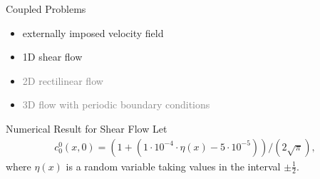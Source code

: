 \begin{frame}{Coupled Problems}
	\begin{itemize}
		\item externally imposed velocity field \checkmark
		\item 1D shear flow \checkmark
		\item \textcolor{gray}{2D rectilinear flow \checkmark}
		\item \textcolor{gray}{3D flow with periodic boundary conditions}
	\end{itemize}
\end{frame}

\begin{frame}{Numerical Result for Shear Flow}
		\scriptsize
		Let 
		\begin{align*}
			c^0_0 (x,0) = (1+(1\cdot10^{-4} \cdot \eta(x)-5\cdot10^{-5}))/(2\sqrt{\pi}),
		\end{align*}
		where $\eta(x)$ is a random variable taking values in the interval $\pm \frac{1}{2}$.
		

\end{frame}

